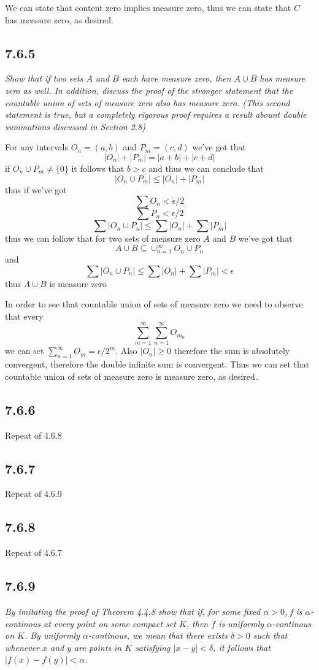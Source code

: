 \documentclass[11pt,oneside,titlepage]{book}
\begin{document}
We can state that content zero implies measure zero, thus we can state that
$C$ has measure zero, as desired.

\subsection*{7.6.5}
\textit{Show that if two sets $A$ and $B$ each have measure zero, then
  $A \cup B$ has measure zero as well. In addition, discuss the proof of the
  stronger statement that the countable union of sets of measure zero also has
  measure zero. (This second statement is true, but a completely rigorous
  proof requires a result abount double summations discussed in Section 2.8)}


For any intervals $O_n = (a, b)$ and $P_m = (c, d)$ we've got that
$$|O_n| + |P_m| = |a + b| + |c + d|$$
if $O_n \cup P_m \neq \{0\}$ it follows that $b > c$ and thus we can conclude
that
$$|O_n \cup P_m| \leq |O_n| + |P_m|$$
thus if we've got
$$\sum O_n < \epsilon/2$$
$$\sum P_n < \epsilon/2$$
$$\sum |O_n \cup P_n| \leq  \sum|O_n| + \sum|P_m|$$
thus we can follow that for two sets of measure zero  $A$ and $B$ we've got
that
$$A \cup B \subseteq \cup_{n = 1}^\infty{O_n \cup P_n}$$
and
$$\sum |O_n \cup P_n| \leq  \sum|O_n| + \sum|P_m| < \epsilon$$
thus $A \cup B$ is measure zero

In order to see that countable union of sets of measure zero we need to observe
that every
$$ \sum_{m = 1}^\infty{ \sum_{n = 1}^\infty{O_{m_n}}}$$
we can set $\sum_{n = 1}^\infty{O_m} = \epsilon / 2^m$. Also $|O_n| \geq 0$
therefore the sum
is  absolutely convergent, therefore the double infinite sum is convergent.
Thus we can set that countable union of sets of measure zero is measure zero,
as desired.

\subsection*{7.6.6}
Repeat of 4.6.8

\subsection*{7.6.7}
Repeat of 4.6.9

\subsection*{7.6.8}
Repeat of 4.6.7

\subsection*{7.6.9}
\textit{By imitating the proof of Theorem 4.4.8 show that if, for some fixed
  $\alpha > 0$, f is $\alpha$-continous at every point on some compact set $K$,
  then $f$ is uniformly $\alpha$-continous on $K$. By uniformly
  $\alpha$-continous, we mean that there exists $\delta > 0$ such that
  whenever  $x$ and $y$ are points in $K$ satisfying
  $|x - y| < \delta$, it follows that $|f(x) - f(y)| < \alpha$.}
\end{document}
